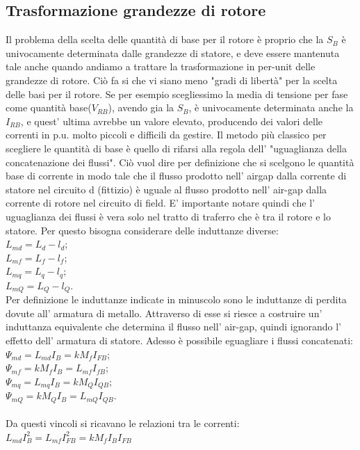 \documentclass[Lau,noexaminfo]{sapthesis}
\begin{document}
	 \subsection{Trasformazione grandezze di rotore}
	 Il problema della scelta delle quantità di base per il rotore è proprio che la $S_B$ è univocamente determinata dalle grandezze di statore, e deve essere mantenuta tale anche quando andiamo a trattare la trasformazione in per-unit delle grandezze di rotore. Ciò fa si che vi siano meno "gradi di libertà" per la scelta delle basi per il rotore. Se per esempio scegliessimo la media di tensione per fase come quantità base($V_{RB}$), avendo gia la $S_B$, è univocamente determinata anche la $I_{RB}$, e quest' ultima avrebbe un valore elevato, producendo dei valori delle correnti in p.u. molto piccoli e difficili da gestire. Il metodo più classico per scegliere le quantità di base è quello di rifarsi alla regola dell' "uguaglianza della concatenazione dei flussi". Ciò vuol dire per definizione che si scelgono le quantità base di corrente in modo tale che il flusso prodotto nell' airgap dalla corrente di statore nel circuito d (fittizio) è uguale al flusso prodotto nell' air-gap dalla corrente di rotore nel circuito di field. E' importante notare quindi che l' uguaglianza dei flussi è vera solo nel tratto di traferro che è tra il rotore e lo statore. Per questo bisogna considerare delle induttanze diverse:\\
	 $L_{md}=L_d-l_d$;\\
	 $L_{mf}=L_f-l_f$;\\
	 $L_{mq}=L_q-l_q$;\\
	 $L_{mQ}=L_Q-l_Q$.\\
	 Per definizione le induttanze indicate in minuscolo sono le induttanze di perdita dovute all' armatura di metallo. Attraverso di esse si riesce a costruire un' induttanza equivalente che determina il flusso nell' air-gap, quindi ignorando l' effetto dell' armatura di statore. Adesso è possibile eguagliare i flussi concatenati:\\
	 $\Psi_{md}=L_{md}I_B=kM_f I_{FB}$;\\
	 $\Psi_{mf}=kM_fI_B=L_{mf}I_{fB}$;\\
	 $\Psi_{mq}=L_{mq}I_B=kM_QI_{QB}$;\\
	 $\Psi_{mQ}=kM_Q I_B=L_{mQ}I_{QB}$.\\\\
	 Da questi vincoli si ricavano le relazioni tra le correnti:\\
	 $L_{md} I_B^2=L_{mf}I_{FB}^2=kM_fI_BI_{FB}$\\
\end{document}
